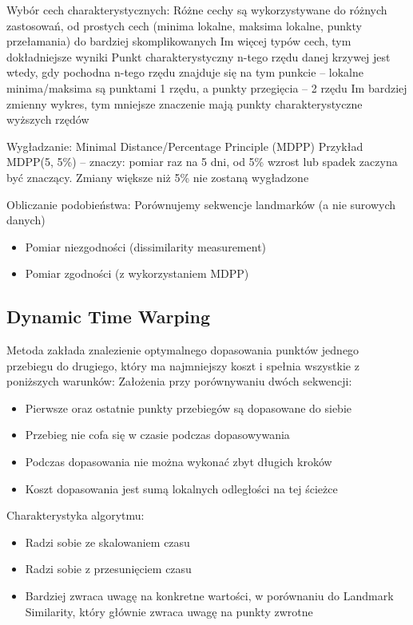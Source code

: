             \par
            Wybór cech charakterystycznych:
            Różne cechy są wykorzystywane do różnych zastosowań, od prostych cech (minima lokalne, maksima lokalne, punkty przełamania) do bardziej skomplikowanych
            Im więcej typów cech, tym dokładniejsze wyniki
            Punkt charakterystyczny n-tego rzędu danej krzywej jest wtedy, gdy pochodna n-tego rzędu znajduje się na tym punkcie – lokalne minima/maksima są punktami 1 rzędu, a punkty przegięcia – 2 rzędu
            Im bardziej zmienny wykres, tym mniejsze znaczenie mają punkty charakterystyczne wyższych rzędów
            \par
            Wygładzanie: Minimal Distance/Percentage Principle (MDPP) 
            Przykład MDPP(5, 5\%) – znaczy: pomiar raz na 5 dni, od 5\% wzrost lub spadek zaczyna być znaczący. Zmiany większe niż 5\% nie zostaną wygładzone
            \par 
            Obliczanie podobieństwa: Porównujemy sekwencje landmarków (a nie surowych danych)
            \begin{itemize}
                \item Pomiar niezgodności (dissimilarity measurement)
                \item Pomiar zgodności (z wykorzystaniem MDPP)
            \end{itemize}
        
        \subsection{Dynamic Time Warping}
        \label{theory:DTW}
            Metoda zakłada znalezienie optymalnego dopasowania punktów jednego przebiegu do drugiego, który ma najmniejszy koszt i spełnia wszystkie z poniższych warunków:
            Założenia przy porównywaniu dwóch sekwencji:
            \begin{itemize}
                \item Pierwsze oraz ostatnie punkty przebiegów są dopasowane do siebie
                \item Przebieg nie cofa się w czasie podczas dopasowywania
                \item Podczas dopasowania nie można wykonać zbyt długich kroków
                \item Koszt dopasowania jest sumą lokalnych odległości na tej ścieżce
            \end{itemize}
            Charakterystyka algorytmu:
            \begin{itemize}
                \item Radzi sobie ze skalowaniem czasu 
                \item Radzi sobie z przesunięciem czasu
                \item Bardziej zwraca uwagę na konkretne wartości, w porównaniu do Landmark Similarity, który głównie zwraca uwagę na punkty zwrotne
            \end{itemize}
        
